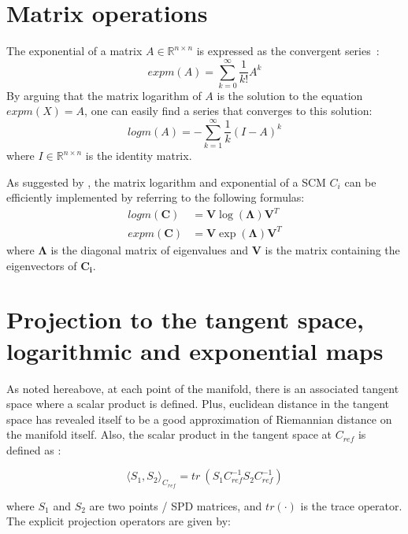 \documentclass[a4paper,11pt]{report}
\begin{document}
\section{Matrix operations}

The exponential of a matrix $A \in \mathbb{R}^{n \times n}$ is expressed as the convergent series~\citep{doi:10.1137/S0895479803436937}:
\begin{equation}
  expm(A) = \sum\limits_{k=0}^{\infty} \frac{1}{k!} A^k
\end{equation}
By arguing that the matrix logarithm of $A$ is the solution to the equation $expm(X) = A$, one can easily find a series that converges to this solution:
\begin{equation}
  logm(A) = - \sum\limits_{k=1}^{\infty} \frac{1}{k} (I - A)^k
\end{equation}
\noindent where $I \in \mathbb{R}^{n \times n}$ is the identity matrix.

As suggested by \citep{BARACHANT2013172}, the matrix logarithm and exponential of a SCM $C_i$ can be efficiently implemented by referring to the following formulas:
\begin{align}
  logm(\mathbf{C}) & = \mathbf{V} \log{(\mathbf{\Lambda})} \mathbf{V}^T \\
  expm(\mathbf{C}) & = \mathbf{V} \exp{(\mathbf{\Lambda})} \mathbf{V}^T
\end{align}
\noindent where $\mathbf{\Lambda}$ is the diagonal matrix of eigenvalues
and $\mathbf{V}$ is the matrix containing the eigenvectors of $\mathbf{C_i}$.

\section{Projection to the tangent space, logarithmic and exponential maps}

As noted hereabove, at each point of the manifold, there is an associated tangent space where a scalar product is defined.
Plus, euclidean distance in the tangent space has revealed itself to be a good approximation of Riemannian distance
on the manifold itself. Also, the scalar product in the tangent space at $C_{ref}$ is defined as \citep{BARACHANT2013172}:

\begin{equation}
    \langle S_1, S_2 \rangle_{C_{ref}} = tr \ (S_1 C_{ref}^{-1} S_2 C_{ref}^{-1})
\end{equation}

\noindent where $S_1$ and $S_2$ are two points / SPD matrices, and $tr(\cdot)$ is the trace operator.
The explicit projection operators are given by:
\end{document}
